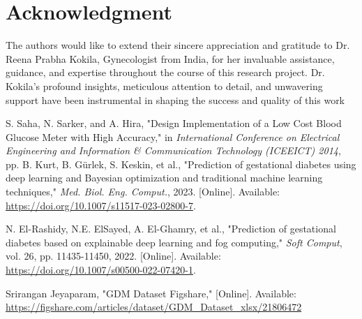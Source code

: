 \documentclass[conference,compsoc]{IEEEtran}
\begin{document}
  \section*{Acknowledgment}
\fi


The authors would like to extend their sincere appreciation and gratitude to Dr. Reena Prabha Kokila, Gynecologist from India, for her invaluable assistance, guidance, and expertise throughout the course of this research project. Dr. Kokila's profound insights, meticulous attention to detail, and unwavering support have been instrumental in shaping the success and quality of this work




%
%
%
\begin{thebibliography}{1}

S. Saha, N. Sarker, and A. Hira, "Design  Implementation of a Low Cost Blood Glucose Meter with High Accuracy," in \emph{International Conference on Electrical Engineering and Information \& Communication Technology (ICEEICT) 2014}, pp.
    B. Kurt, B. Gürlek, S. Keskin, et al., "Prediction of gestational diabetes using deep learning and Bayesian optimization and traditional machine learning techniques," \emph{Med. Biol. Eng. Comput.}, 2023. [Online]. Available: \url{https://doi.org/10.1007/s11517-023-02800-7}.

    N. El-Rashidy, N.E. ElSayed, A. El-Ghamry, et al., "Prediction of gestational diabetes based on explainable deep learning and fog computing," \emph{Soft Comput}, vol. 26, pp. 11435-11450, 2022. [Online]. Available: \url{https://doi.org/10.1007/s00500-022-07420-1}.


    Srirangan Jeyaparam, "GDM Dataset Figshare," [Online]. Available: \url{https://figshare.com/articles/dataset/GDM_Dataset_xlsx/21806472}
    
\end{thebibliography}


\end{document}
